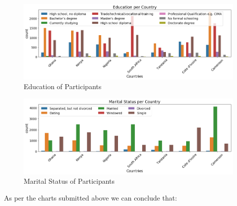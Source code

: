 \begin{Schunk}
\begin{figure}[H]

{\centering \includegraphics[width=1.15\linewidth]{../../artifacts/participant_education} 

}

\caption[Education of Participants]{Education of Participants}\label{fig:pe}
\end{figure}
\end{Schunk}

\begin{Schunk}
\begin{figure}[H]

{\centering \includegraphics[width=1.15\linewidth]{../../artifacts/participant_marital} 

}

\caption[Marital Status of Participants]{Marital Status of Participants}\label{fig:pms}
\end{figure}
\end{Schunk}

As per the charts submitted above we can conclude that:

